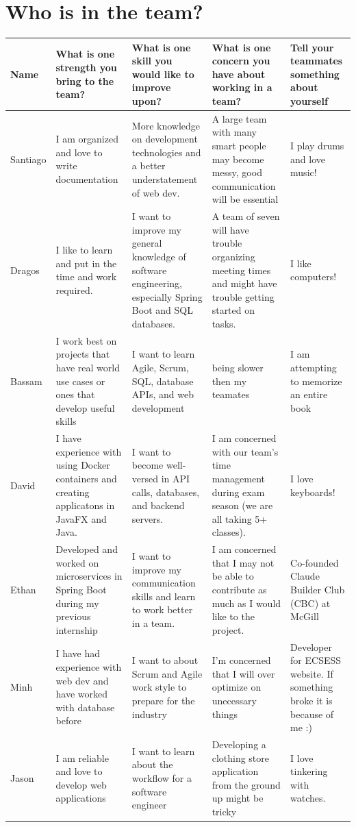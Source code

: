 \documentclass[11pt]{article}
\begin{document}
\section*{Who is in the team?}
\begin{center}
    \begin{tabular}{|p{2cm}|p{3cm}|p{3cm}|p{3cm}|p{3cm}|}
        \hline
        \textbf{Name} & \textbf{What is one strength you bring to the team?} & \textbf{What is one skill you would like to improve upon?} & \textbf{What is one concern you have about working in a team?} & \textbf{Tell your teammates something about yourself} \\
        \hline
        Santiago & I am organized and love to write documentation & More knowledge on development technologies and a better understatement of web dev. & A large team with many smart people may become messy, good communication will be essential & I play drums and love music! \\
        \hline
        Dragos & I like to learn and put in the time and work required. & I want to improve my general knowledge of software engineering, especially Spring Boot and SQL databases. & A team of seven will have trouble organizing meeting times and might have trouble getting started on tasks. & I like computers! \\
        \hline
        Bassam & I work best on projects that have real world use cases or ones that develop useful skills & I want to learn Agile, Scrum, SQL, database APIs, and web development & being slower then my teamates & I am attempting to memorize an entire book \\
        \hline
        David & I have experience with using Docker containers and creating applicatons in JavaFX and Java. & I want to become well-versed in API calls, databases, and backend servers. & I am concerned with our team's time management during exam season (we are all taking 5+ classes). & I love keyboards! \\
        \hline
        Ethan & Developed and worked on microservices in Spring Boot during my previous internship & I want to improve my communication skills and learn to work better in a team. & I am concerned that I may not be able to contribute as much as I would like to the project. & Co-founded Claude Builder Club (CBC) at McGill \\
        \hline
        Minh & I have had experience with web dev and have worked with database before & I want to about Scrum and Agile work style to prepare for the industry & I'm concerned that I will over optimize on unecessary things & Developer for ECSESS website. If something broke it is because of me :) \\
        \hline
        Jason & I am reliable and love to develop web applications & I want to learn about the workflow for a software engineer & Developing a clothing store application from the ground up might be tricky & I love tinkering with watches. \\
        \hline
    \end{tabular}
\end{center}
\end{document}
